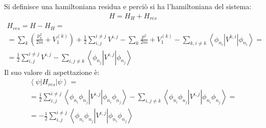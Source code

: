 Si definisce una hamiltoniana residua e perciò si ha l'hamiltoniana del sistema:
\begin{equation}\begin{split}
H=H_H+H_{res}
\end{split}\end{equation}
\begin{equation}\begin{split}
H_{res}=H-H_H=\\
=\sum_{k}{\left(\frac{p_k^2}{2m}+V_1^{\left(k\right)}\right)}+\frac{1}{2}\sum_{i,j}^{i\neq j}{V^{i,j}}-\sum_k{\frac{p ^2}{2m}+V_1^{\left(k\right)}}-\sum_{k,i\neq k}{\left\langle \phi_{n_i}\right |V^{k,i}\left |\phi_{n_i} \right\rangle}=\\
=\frac{1}{2}\sum_{i,j}^{i\neq j}{V^{i,j}}-\sum_{i,j\neq k}{\left\langle \phi_{n_j}\right |V^{i,j}\left |\phi_{n_j} \right\rangle}
\end{split}\end{equation}
Il suo valore di aspettazione è:
\begin{equation}\begin{split}
\left\langle \psi \right |H_{res}\left |\psi  \right\rangle=\\
=\frac{1}{2}\sum_{i,j}^{i\neq j}{\left\langle \phi_{n_i}\phi_{n_j}\right |V^{i,j}\left |\phi_{n_i}\phi_{n_j} \right\rangle}-\sum_{i,j\neq k}{\left\langle \phi_{n_i}\phi_{n_j}\right |V^{i,j}\left |\phi_{n_i}\phi_{n_j} \right\rangle}=\\
=-\frac{1}{2}\sum_{i,j}^{i\neq j}{\left\langle \phi_{n_i}\phi_{n_j}\right |V^{i,j}\left |\phi_{n_i}\phi_{n_j} \right\rangle}
\end{split}\end{equation}

